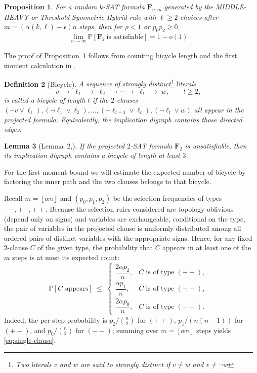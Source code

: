 \documentclass[11pt,reqno]{amsart}
\numberwithin{equation}{section}
\renewcommand{\vec}[1]{\boldsymbol{#1}}
\newcommand\vF{\vec F}
\newcommand\pr{\mathbb{P}}
\renewcommand\Pr{\pr}
\newcommand\Lem{Lemma}
\newcommand\Prop{Proposition}
\newtheorem{definition}{Definition}[section]
\newtheorem{lemma}[definition]{Lemma}
\newtheorem{proposition}[definition]{Proposition}
\newcommand{\floor}[1]{\left\lfloor#1\right\rfloor}
\def\pr{{\mathbb P}}
\begin{document}
	\begin{proposition}\label{prop_2sat}
		For a random $k$-SAT formula \(\vF_{n,m}\) generated by the MIDDLE-HEAVY or Threshold-Symmetric Hybrid rule with \(\ell \geq 2\) choices after \(m = (\alpha(k,\ell) - \epsilon)n\) steps, then for $\rho<1$ or $p_0p_2\geq 0$,
		\begin{align*}
			\lim_{n\to\infty}\pr[\vF_2 ~\mbox{is satisfiable}]=1-o(1)
		\end{align*}
	\end{proposition}
The proof of \Prop~\ref{prop_2sat} follows from counting bicycle length and the first moment calculation in \cite{CR}.

\begin{definition}[Bicycle]
	\label{def:hooked}
	A sequence of strongly distinct\footnote{Two literals $v$ and $w$ are said to strongly distinct if $v\neq w$ and $v\neq \neg w$} literals
	\[
	v\;\to\; \ell_1\;\to\; \ell_2\;\to\cdots\to\; \ell_t\;\to\; w,
	\qquad t\ge 2,
	\]
	is called a bicycle of length $t$ if the $2$-clauses
	\((\neg v\vee \ell_1),(\neg \ell_1\vee \ell_2),\ldots,(\neg \ell_{t-1}\vee \ell_t),(\neg \ell_t\vee w)\)
	all appear in the projected formula. 
	Equivalently, the implication digraph contains those directed edges.
\end{definition}
 
 \begin{lemma}[\Lem~2,\cite{MSen}]\label{lem:hooked-from-contradiction}
	If the projected $2$-SAT formula $\vF_2$ is unsatisfiable, then its implication digraph contains a bicycle of length at least $3$.
\end{lemma}
For the first-moment bound we will estimate the expected number of bicycle by factoring the inner path and the two clauses belongs to that bicycle. 

Recall $m=\floor{\alpha n}$ and $(p_0,p_1,p_2)$ be the selection frequencies of types $--,+-,++$.
Because the selection rules considered are topology-oblivious (depend only on signs) and variables are exchangeable, conditional on the type, the pair of variables in the projected clause is uniformly distributed among all ordered pairs of distinct variables with the appropriate signs.
Hence, for any fixed $2$-clause $C$ of the given type, the probability that $C$ appears in at least one of the $m$ steps is at most its expected count:
\begin{equation}\label{eq:single-clause}
	\Pr[C\text{ appears}] \;\le\;
	\begin{cases}
		\dfrac{2\alpha p_2}{n},& C\text{ is of type }(++),\\[8pt]
		\dfrac{\alpha p_1}{n},& C\text{ is of type }(+ -),\\[8pt]
		\dfrac{2\alpha p_0}{n},& C\text{ is of type }(--).
	\end{cases}
\end{equation}
Indeed, the per-step probability is $p_2/\binom{n}{2}$ for $(++)$, $p_1/(n(n-1))$ for $(+-)$, and $p_0/\binom{n}{2}$ for $(--)$; summing over $m=\floor{\alpha n}$ steps yields \eqref{eq:single-clause}.
\end{document}
